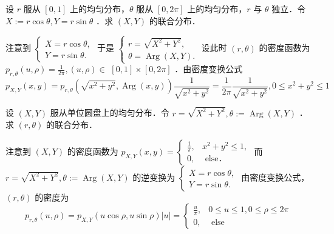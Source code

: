 \begin{exercise}
    设 $r$ 服从 $[0,1]$ 上的均匀分布，$\theta$ 服从 $[0,2 \pi]$ 上的均匀分布，$r$ 与 $\theta$ 独立．令 $X:=r \cos \theta, Y=r \sin \theta$ ．求 $(X, Y)$ 的联合分布．
\end{exercise}
\begin{solution}
    注意到 $\left\{\begin{array}{l}X=r \cos \theta, \\ Y=r \sin \theta .\end{array}\right.$ 于是 $\left\{\begin{array}{l}r=\sqrt{X^2+Y^2}, \\ \theta=\operatorname{Arg}(X, Y) .\end{array}\right.$ 设此时 $(r, \theta)$ 的密度函数为 $p_{r, \theta}(u, \rho)=\frac{1}{2 \pi},(u, \rho) \in$ $[0,1] \times[0,2 \pi]$ ．由密度变换公式
    $$
        p_{X, Y}(x, y)=p_{r, \theta}\left(\sqrt{x^2+y^2}, \operatorname{Arg}(x, y)\right) \frac{1}{\sqrt{x^2+y^2}}=\frac{1}{2 \pi} \frac{1}{\sqrt{x^2+y^2}}, 0 \leq x^2+y^2 \leq 1
    $$
\end{solution}
\begin{exercise}
    设 $(X, Y)$ 服从单位圆盘上的均匀分布．令 $r=\sqrt{X^2+Y^2}, \theta:=\operatorname{Arg}(X, Y)$ ．求 $(r, \theta)$ 的联合分布．
\end{exercise}
\begin{solution}
    注意到 $(X, Y)$ 的密度函数为 $p_{X, Y}(x, y)=\left\{\begin{array}{ll}\frac{1}{\pi}, & x^2+y^2 \leq 1, \\ 0, & \text { else．}\end{array}\right.$ 而 $r=\sqrt{X^2+Y^2}, \theta:=\operatorname{Arg}(X, Y)$ 的逆变换为 $\left\{\begin{array}{l}X=r \cos \theta, \\ Y=r \sin \theta .\end{array}\right.$ 由密度变换公式，$(r, \theta)$ 的密度为
    $$
        p_{r, \theta}(u, \rho)=p_{X, Y}(u \cos \rho, u \sin \rho)|u|= \begin{cases}\frac{u}{\pi}, & 0 \leq u \leq 1,0 \leq \rho \leq 2 \pi \\ 0, & \text { else }\end{cases}
    $$
\end{solution}

